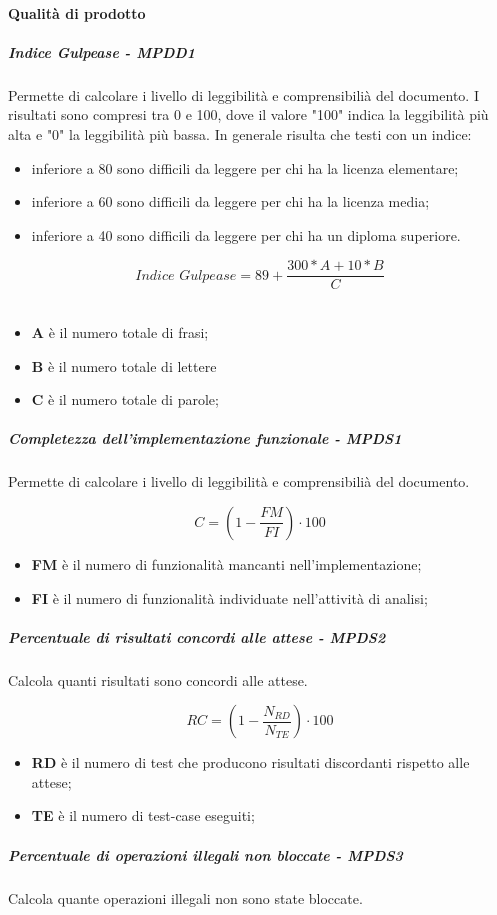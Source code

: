 \paragraph{Qualità di prodotto}
\subparagraph{Indice Gulpease - MPDD1}
Permette di calcolare i livello di leggibilità e comprensibilià del documento.
I risultati sono compresi tra 0 e 100, dove il valore "100" indica la leggibilità più alta e "0" la leggibilità più bassa. In generale risulta che testi con un indice:
\begin{itemize}
	\item inferiore a 80 sono difficili da leggere per chi ha la licenza elementare;
	\item inferiore a 60 sono difficili da leggere per chi ha la licenza media;
	\item inferiore a 40 sono difficili da leggere per chi ha un diploma superiore. \\
\end{itemize}
\begin{equation*}\textit{Indice Gulpease} = 89 + \frac{300 * \textit{A} + 10 * B}{C}\end{equation*} \\
\begin{itemize}
	\item \textbf{A} è il numero totale di frasi;
	\item \textbf{B} è il numero totale di lettere
	\item \textbf{C} è il numero totale di parole;
\end{itemize}
\subparagraph{Completezza dell’implementazione funzionale - MPDS1}
Permette di calcolare i livello di leggibilità e comprensibilià del documento.

\begin{equation*}
C=(1-\frac{FM}{FI})\cdot 100
\end{equation*}
\begin{itemize}
	\item \textbf{FM} è il numero di funzionalità mancanti nell'implementazione;
	\item \textbf{FI} è il numero di funzionalità individuate nell'attività di analisi;
\end{itemize}
\subparagraph{Percentuale di risultati concordi alle attese - MPDS2}
Calcola quanti risultati sono concordi alle attese.

\begin{equation*} RC = (1-\frac{N_{RD}}{N_{TE}}) \cdot 100 \end{equation*}
\begin{itemize}
	\item \textbf{RD} è il numero di test che producono risultati discordanti rispetto alle attese;
	\item \textbf{TE}  è il numero di test-case eseguiti;
\end{itemize}
\subparagraph{Percentuale di operazioni illegali non bloccate - MPDS3}
Calcola quante operazioni illegali non sono state bloccate.

